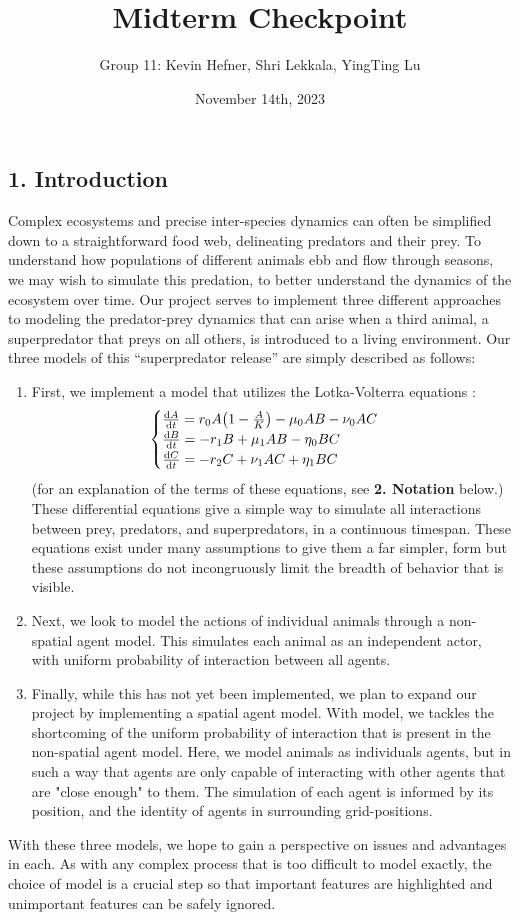 \documentclass{article}
\title{Midterm Checkpoint}
\author{Group 11: Kevin Hefner, Shri Lekkala, YingTing Lu}
\date{November 14th, 2023}
\begin{document}
\maketitle


\subsection*{1. Introduction}
Complex ecosystems and precise inter-species dynamics can often be simplified down to a straightforward food web, delineating predators and their prey. To understand how populations of different animals ebb and flow through seasons, we may wish to simulate this predation, to better understand the dynamics of the ecosystem over time. Our project serves to implement three different approaches to modeling the predator-prey dynamics that can arise when a third animal, a superpredator that preys on all others, is introduced to a living environment. \cite{cats_protecting_birds,cats_protecting_revisited} Our three models of this “superpredator release” are simply described as follows:\begin{enumerate}
    \item First, we implement a model that utilizes the Lotka-Volterra equations \cite{meiss_textbook}:
    $$\begin{cases}
        \dv{A}{t} = r_0A\qty(1-\frac{A}{K}) - \mu_0AB - \nu_0AC\\
        \dv{B}{t} = -r_1B + \mu_1AB - \eta_0BC\\
        \dv{C}{t} = -r_2C + \nu_1AC + \eta_1BC
    \end{cases}$$
    \indent (for an explanation of the terms of these equations, see \textbf{2. Notation} below.)\\
    These differential equations give a simple way to simulate all interactions between prey, predators, and superpredators, in a continuous timespan. These equations exist under many assumptions to give them a far simpler, form but these assumptions do not incongruously limit the breadth of behavior that is visible.
    \item Next, we look to model the actions of individual animals through a non-spatial agent model. This simulates each animal as an independent actor, with uniform probability of interaction between all agents.
    \item Finally, while this has not yet been implemented, we plan to expand our project by implementing a spatial agent model. With model, we tackles the shortcoming of the uniform probability of interaction that is present in the non-spatial agent model. Here, we model animals as individuals agents, but in such a way that agents are only capable of interacting with other agents that are "close enough" to them. The simulation of each agent is informed by its position, and the identity of agents in surrounding grid-positions.
\end{enumerate}
\indent With these three models, we hope to gain a perspective on issues and advantages in each. As with any complex process that is too difficult to model exactly, the choice of model is a crucial step so that important features are highlighted and unimportant features can be safely ignored.
\end{document}
